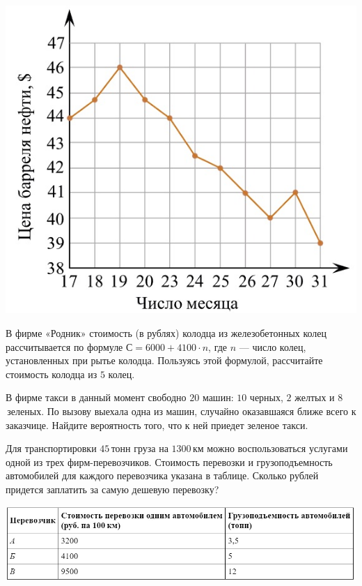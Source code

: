 \begin{class}[number=6]
\begin{listofex}
\begin{minipage}[t]{0.45\linewidth}
			\includegraphics[align=t, width=\linewidth]{../pics/G101M8L6-1}
		\end{minipage}
		\item В фирме «Родник» стоимость (в рублях) колодца из железобетонных колец рассчитывается по формуле \(С=6000+4100 \cdot n \), где \(n\) --- число колец, установленных при рытье колодца. Пользуясь этой формулой, рассчитайте стоимость колодца из \(5\) колец.
		\item В фирме такси в данный момент свободно \(20\)  машин: \(10\)  черных, \(2\)  желтых и \(8\) зеленых. По вызову выехала одна из машин, случайно оказавшаяся ближе всего к заказчице. Найдите вероятность того, что к ней приедет зеленое такси.
		\item 
		\begin{minipage}[t]{\linewidth}
			Для транспортировки \(45\) тонн груза на \(1300\) км можно воспользоваться услугами одной из трех фирм-перевозчиков. Стоимость перевозки и грузоподъемность автомобилей для каждого перевозчика указана в таблице. Сколько рублей придется заплатить за самую дешевую перевозку?
		\end{minipage}
		\hspace{0.02\linewidth}
		\begin{minipage}[t]{\linewidth}
			\includegraphics[align=t, width=\linewidth]{../pics/G101M8L6-2}

\end{minipage}
\end{listofex}
\end{class}
